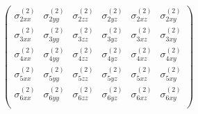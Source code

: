 \begin{equation*}
\begin{pmatrix}
\sigma_{2xx}^{\left(2\right)}&\sigma_{2yy}^{\left(2\right)}&\sigma_{2zz}^{\left(2\right)}&\sigma_{2yz}^{\left(2\right)}&\sigma_{2xz}^{\left(2\right)}&\sigma_{2xy}^{\left(2\right)} \\
\sigma_{3xx}^{\left(2\right)}&\sigma_{3yy}^{\left(2\right)}&\sigma_{3zz}^{\left(2\right)}&\sigma_{3yz}^{\left(2\right)}&\sigma_{3xz}^{\left(2\right)}&\sigma_{3xy}^{\left(2\right)} \\
\sigma_{4xx}^{\left(2\right)}&\sigma_{4yy}^{\left(2\right)}&\sigma_{4zz}^{\left(2\right)}&\sigma_{4yz}^{\left(2\right)}&\sigma_{4xz}^{\left(2\right)}&\sigma_{4xy}^{\left(2\right)} \\
\sigma_{5xx}^{\left(2\right)}&\sigma_{5yy}^{\left(2\right)}&\sigma_{5zz}^{\left(2\right)}&\sigma_{5yz}^{\left(2\right)}&\sigma_{5xz}^{\left(2\right)}&\sigma_{5xy}^{\left(2\right)} \\
\sigma_{6xx}^{\left(2\right)}&\sigma_{6yy}^{\left(2\right)}&\sigma_{6zz}^{\left(2\right)}&\sigma_{6yz}^{\left(2\right)}&\sigma_{6xz}^{\left(2\right)}&\sigma_{6xy}^{\left(2\right)} \\
\end{pmatrix} 
\end{equation*}
\\
\\
